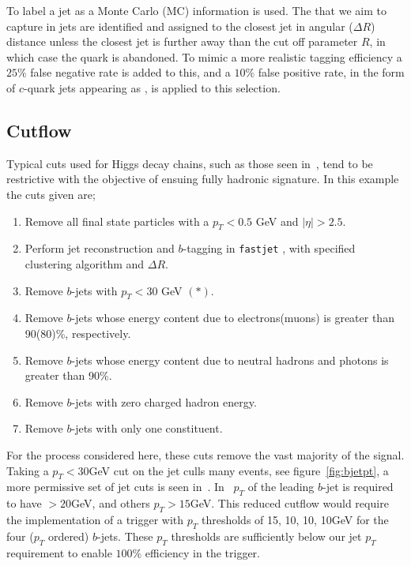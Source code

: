 To label a jet as a  Monte Carlo (MC) information is used.
The  that we aim to capture in jets are identified and
assigned to the closest jet in angular (\(\Delta R\)) distance
unless the closest jet is further away than the cut off parameter \(R\),
in which case the quark is abandoned.
To mimic a more realistic tagging efficiency a
\(25\%\) false negative rate is added to this,
and a \(10\%\) false positive rate, in the form of \(c\)-quark
jets appearing as , is applied to this selection.

\subsection{Cutflow}\label{sec:cutflow}

Typical cuts used for Higgs decay chains,
such as those seen in~\cite{Sirunyan2018alljet},
tend to be restrictive with the objective of 
ensuing fully hadronic signature. 
In this example the cuts given are;
\begin{enumerate}
    \item Remove all final state particles with a $p_T < 0.5$ GeV and $|\eta| > 2.5$.
    \item Perform jet reconstruction and $b$-tagging in {\tt fastjet} \cite{Cacciari2011FastJet}, with specified clustering algorithm and $\Delta R$.
    \item Remove $b$-jets with $p_T < 30$ GeV $(*)$.
    \item Remove $b$-jets whose energy content due to electrons(muons) is greater than  90(80)\%, respectively.
    \item Remove $b$-jets whose energy content due to neutral hadrons and photons is greater than 90\%.
    \item Remove $b$-jets with zero charged hadron energy.
    \item Remove $b$-jets with only one constituent.
\end{enumerate}

For the process considered here, 
these cuts remove the vast majority of the signal.
Taking a \(p_T < 30\)GeV cut on the jet culls many events,
see figure~\ref{fig:bjetpt},
a more permissive set of jet cuts is seen in~\cite{Sirunyan2019exotic}.
In~\cite{Sirunyan2019exotic} $p_T$ of the leading $b$-jet is required to have $>20$GeV, and others $p_T > 15$GeV. 
 This reduced cutflow would require the implementation of a trigger with $p_T$ thresholds of 15, 10, 10, 10GeV for the four ($p_T$ ordered) $b$-jets.
 These $p_T$ thresholds are sufficiently below our jet $p_T$ requirement to enable $100\%$ efficiency in the trigger. 

